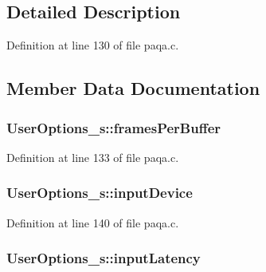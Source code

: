 \subsection{Detailed Description}


Definition at line 130 of file paqa.\+c.



\subsection{Member Data Documentation}
\subsubsection[{\texorpdfstring{frames\+Per\+Buffer}{framesPerBuffer}}]{ User\+Options\+\_\+s\+::frames\+Per\+Buffer}\hypertarget{struct_user_options__s_a4c32d5a6b71075b1ba9d453dc4b22adb}{}\label{struct_user_options__s_a4c32d5a6b71075b1ba9d453dc4b22adb}


Definition at line 133 of file paqa.\+c.

\subsubsection[{\texorpdfstring{input\+Device}{inputDevice}}]{ User\+Options\+\_\+s\+::input\+Device}\hypertarget{struct_user_options__s_afa87fa54d0095b6182df9b77704d4301}{}\label{struct_user_options__s_afa87fa54d0095b6182df9b77704d4301}


Definition at line 140 of file paqa.\+c.

\subsubsection[{\texorpdfstring{input\+Latency}{inputLatency}}]{ User\+Options\+\_\+s\+::input\+Latency}\hypertarget{struct_user_options__s_ad8d5ceaf8b4494362586252762b9eb37}{}\label{struct_user_options__s_ad8d5ceaf8b4494362586252762b9eb37}


